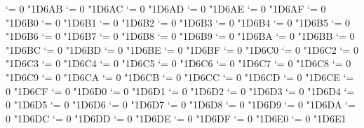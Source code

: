 {  \Umathcode `\Δ = 0 \unimathfam "1D6AB
  \Umathcode `\Ε = 0 \unimathfam "1D6AC
  \Umathcode `\Ζ = 0 \unimathfam "1D6AD
  \Umathcode `\Η = 0 \unimathfam "1D6AE
  \Umathcode `\Θ = 0 \unimathfam "1D6AF
  \Umathcode `\Ι = 0 \unimathfam "1D6B0
  \Umathcode `\Κ = 0 \unimathfam "1D6B1
  \Umathcode `\Λ = 0 \unimathfam "1D6B2
  \Umathcode `\Μ = 0 \unimathfam "1D6B3
  \Umathcode `\Ν = 0 \unimathfam "1D6B4
  \Umathcode `\Ξ = 0 \unimathfam "1D6B5
  \Umathcode `\Ο = 0 \unimathfam "1D6B6
  \Umathcode `\Π = 0 \unimathfam "1D6B7
  \Umathcode `\Ρ = 0 \unimathfam "1D6B8
  \Umathcode `\ϴ = 0 \unimathfam "1D6B9
  \Umathcode `\Σ = 0 \unimathfam "1D6BA
  \Umathcode `\Τ = 0 \unimathfam "1D6BB
  \Umathcode `\Υ = 0 \unimathfam "1D6BC
  \Umathcode `\Φ = 0 \unimathfam "1D6BD
  \Umathcode `\Χ = 0 \unimathfam "1D6BE
  \Umathcode `\Ψ = 0 \unimathfam "1D6BF
  \Umathcode `\Ω = 0 \unimathfam "1D6C0
  \Umathcode `\α = 0 \unimathfam "1D6C2
  \Umathcode `\β = 0 \unimathfam "1D6C3
  \Umathcode `\γ = 0 \unimathfam "1D6C4
  \Umathcode `\δ = 0 \unimathfam "1D6C5
  \Umathcode `\ε = 0 \unimathfam "1D6C6
  \Umathcode `\ζ = 0 \unimathfam "1D6C7
  \Umathcode `\η = 0 \unimathfam "1D6C8
  \Umathcode `\θ = 0 \unimathfam "1D6C9
  \Umathcode `\ι = 0 \unimathfam "1D6CA
  \Umathcode `\κ = 0 \unimathfam "1D6CB
  \Umathcode `\λ = 0 \unimathfam "1D6CC
  \Umathcode `\μ = 0 \unimathfam "1D6CD
  \Umathcode `\ν = 0 \unimathfam "1D6CE
  \Umathcode `\ξ = 0 \unimathfam "1D6CF
  \Umathcode `\ο = 0 \unimathfam "1D6D0
  \Umathcode `\π = 0 \unimathfam "1D6D1
  \Umathcode `\ρ = 0 \unimathfam "1D6D2
  \Umathcode `\ς = 0 \unimathfam "1D6D3
  \Umathcode `\σ = 0 \unimathfam "1D6D4
  \Umathcode `\τ = 0 \unimathfam "1D6D5
  \Umathcode `\υ = 0 \unimathfam "1D6D6
  \Umathcode `\ϕ = 0 \unimathfam "1D6D7
  \Umathcode `\χ = 0 \unimathfam "1D6D8
  \Umathcode `\ψ = 0 \unimathfam "1D6D9
  \Umathcode `\ω = 0 \unimathfam "1D6DA
  \Umathcode `\ϵ = 0 \unimathfam "1D6DC
  \Umathcode `\ϑ = 0 \unimathfam "1D6DD
  \Umathcode `\ϰ = 0 \unimathfam "1D6DE
  \Umathcode `\φ = 0 \unimathfam "1D6DF
  \Umathcode `\ϱ = 0 \unimathfam "1D6E0
  \Umathcode `\ϖ = 0 \unimathfam "1D6E1
\tenbf}

